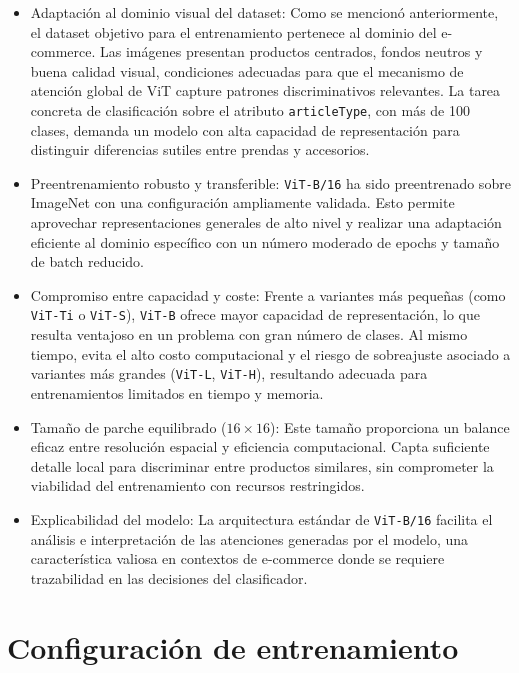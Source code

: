 \begin{itemize}
\item Adaptación al dominio visual del dataset: Como se mencionó anteriormente, el dataset objetivo para el entrenamiento pertenece al dominio del e-commerce. Las imágenes presentan productos centrados, fondos neutros y buena calidad visual, condiciones adecuadas para que el mecanismo de atención global de ViT capture patrones discriminativos relevantes. La tarea concreta de clasificación sobre el atributo \texttt{articleType}, con más de 100 clases, demanda un modelo con alta capacidad de representación para distinguir diferencias sutiles entre prendas y accesorios.

\item Preentrenamiento robusto y transferible: \texttt{ViT-B/16} ha sido preentrenado sobre ImageNet con una configuración ampliamente validada. Esto permite aprovechar representaciones generales de alto nivel y realizar una adaptación eficiente al dominio específico con un número moderado de epochs y tamaño de batch reducido.

\item Compromiso entre capacidad y coste: Frente a variantes más pequeñas (como \texttt{ViT-Ti} o \texttt{ViT-S}), \texttt{ViT-B} ofrece mayor capacidad de representación, lo que resulta ventajoso en un problema con gran número de clases. Al mismo tiempo, evita el alto costo computacional y el riesgo de sobreajuste asociado a variantes más grandes (\texttt{ViT-L}, \texttt{ViT-H}), resultando adecuada para entrenamientos limitados en tiempo y memoria.

\item Tamaño de parche equilibrado ($16 \times 16$): Este tamaño proporciona un balance eficaz entre resolución espacial y eficiencia computacional. Capta suficiente detalle local para discriminar entre productos similares, sin comprometer la viabilidad del entrenamiento con recursos restringidos.

\item Explicabilidad del modelo: La arquitectura estándar de \texttt{ViT-B/16} facilita el análisis e interpretación de las atenciones generadas por el modelo, una característica valiosa en contextos de e-commerce donde se requiere trazabilidad en las decisiones del clasificador.
\end{itemize}

\section{Configuración de entrenamiento}


